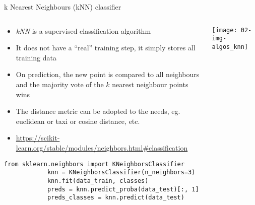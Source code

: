   \begin{frame}[fragile]{k Nearest Neighbours (kNN) classifier}
    \begin{columns}
      \begin{column}{0.65\textwidth}
        \begin{itemize}
          \item \emph{kNN} is a supervised classification algorithm
          \item It does not have a \enquote{real} training step, it simply stores all training data
          \item On prediction, the new point is compared to all neighbours and the majority vote of the $k$ nearest neighbour points wins
          \item The distance metric can be adopted to the needs, eg. euclidean or taxi or cosine distance, etc.
          \item \small\url{https://scikit-learn.org/stable/modules/neighbors.html#classification}
        \end{itemize}
        \begin{mdframed}
          \begin{lstlisting}[style=dark, gobble=10, title=\lsttitlelight{kNN classification [Note: example shortened]}]
            from sklearn.neighbors import KNeighborsClassifier
            knn = KNeighborsClassifier(n_neighbors=3)
            knn.fit(data_train, classes)
            preds = knn.predict_proba(data_test)[:, 1]
            preds_classes = knn.predict(data_test)
          \end{lstlisting}
        \end{mdframed}
      \end{column}
      \begin{column}{0.35\textwidth}
        \vspace{1em}

        \texttt{[image: 02-img-algos\_knn]}
      \end{column}
    \end{columns}
  \end{frame}

